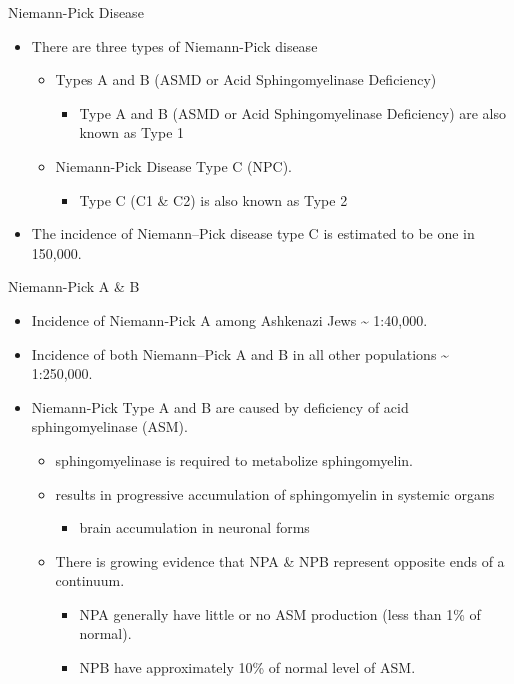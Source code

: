 \documentclass[presentation, smaller]{beamer}
\begin{document}
\begin{frame}[label={sec:orgheadline1}]{Niemann-Pick Disease}
\begin{itemize}
\item There are three types of Niemann-Pick disease
\begin{itemize}
\item Types A and B (ASMD or Acid Sphingomyelinase Deficiency)
\begin{itemize}
\item Type A and B (ASMD or Acid Sphingomyelinase Deficiency) are also known as Type 1
\end{itemize}
\item Niemann-Pick Disease Type C (NPC).
\begin{itemize}
\item Type C (C1 \& C2) is also known as Type 2
\end{itemize}
\end{itemize}

\item The incidence of Niemann–Pick disease type C is estimated to be one in 150,000.
\end{itemize}
\end{frame}
\begin{frame}[label={sec:orgheadline2}]{Niemann-Pick A \& B}
\begin{itemize}
\item Incidence of Niemann-Pick A among Ashkenazi Jews \textasciitilde{} 1:40,000.
\item Incidence of both Niemann–Pick A and B in all other populations \textasciitilde{} 1:250,000.
\item Niemann-Pick Type A and B are caused by deficiency of acid sphingomyelinase (ASM).
\begin{itemize}
\item sphingomyelinase is required to metabolize sphingomyelin.
\item results in progressive accumulation of sphingomyelin in systemic organs
\begin{itemize}
\item brain accumulation in neuronal forms
\end{itemize}
\item There is growing evidence that NPA \& NPB represent opposite ends of a continuum.
\begin{itemize}
\item NPA generally have little or no ASM production (less than 1\% of normal).
\item NPB have approximately 10\% of normal level of ASM.
\end{itemize}
\end{itemize}
\end{itemize}
\end{frame}
\end{document}
